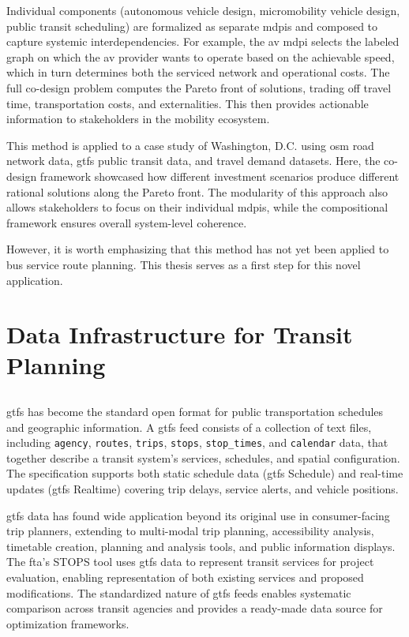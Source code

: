 Individual components (autonomous vehicle design, micromobility vehicle design, public transit scheduling) are formalized as separate \glspl{mdpi} and composed to capture systemic interdependencies. For example, the \gls{av} \gls{mdpi} selects the labeled graph on which the \gls{av} provider wants to operate based on the achievable speed, which in turn determines both the serviced network and operational costs. The full co-design problem computes the Pareto front of solutions, trading off travel time, transportation costs, and externalities. This then provides actionable information to stakeholders in the mobility ecosystem.

This method is applied to a case study of Washington, D.C. using \gls{osm} road network data, \gls{gtfs} public transit data, and travel demand datasets. Here, the co-design framework showcased how different investment scenarios produce different rational solutions along the Pareto front. The modularity of this approach also allows stakeholders to focus on their individual \glspl{mdpi}, while the compositional framework ensures overall system-level coherence.

However, it is worth emphasizing that this method has not yet been applied to bus service route planning. This thesis serves as a first step for this novel application.

\section{Data Infrastructure for Transit Planning}
\subsection{}

\Gls{gtfs} \cite{Overview} has become the standard open format for public transportation schedules and geographic information. A \gls{gtfs} feed consists of a collection of text files, including \verb!agency!, \verb!routes!, \verb!trips!, \verb!stops!, \verb!stop_times!, and \verb!calendar! data, that together describe a transit system's services, schedules, and spatial configuration. The specification supports both static schedule data (\gls{gtfs} Schedule) and real-time updates (\gls{gtfs} Realtime) covering trip delays, service alerts, and vehicle positions.

\Gls{gtfs} data has found wide application beyond its original use in consumer-facing trip planners, extending to multi-modal trip planning, accessibility analysis, timetable creation, planning and analysis tools, and public information displays. The \gls{fta}'s STOPS tool uses \gls{gtfs} data to represent transit services for project evaluation, enabling representation of both existing services and proposed modifications. The standardized nature of \gls{gtfs} feeds enables systematic comparison across transit agencies and provides a ready-made data source for optimization frameworks. \cite{nchrp08-119General, 2019STOPS}

